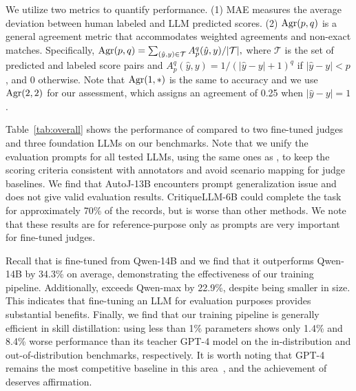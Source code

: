  We utilize two metrics to quantify performance.
(1) MAE measures the average deviation between human labeled and LLM predicted scores.
(2) $\mbox{Agr}(p,q)$ is a general agreement metric that accommodates weighted agreements and non-exact matches. Specifically,
$\mbox{Agr}(p,q)= {\sum_{(\hat{y}, y)\in\mathcal{T}} A^q_p(\hat{y}, y)} / {|\mathcal{T}|},$
where $\mathcal{T}$ is the set of predicted and labeled score pairs  and $A^q_p(\hat{y}, y) = 1 / (|\hat{y} - y| + 1)^q$ if $|\hat{y}-y|< p$, and 0 otherwise. Note that $\mbox{Agr}(1,*)$ is the same to accuracy and we use $\mbox{Agr}(2,2)$ for our assessment, which assigns an agreement of 0.25  when $|\hat{y}-y|=1$.



Table~\ref{tab:overall} shows the performance of \modelname compared to two fine-tuned judges and three foundation LLMs on our benchmarks. Note that we unify the evaluation prompts for all tested LLMs, \ie using the same ones as \modelname, to keep the scoring criteria consistent with annotators and avoid scenario mapping for judge baselines. 
We find that AutoJ-13B encounters prompt generalization issue and does not give valid evaluation results. CritiqueLLM-6B could complete the task for approximately 70\% of the records, but is worse than other methods. We note that these results are for reference-purpose only as prompts are very important for fine-tuned judges. 

Recall that \modelname is fine-tuned from Qwen-14B and we find that it outperforms Qwen-14B by 34.3\% on average, demonstrating the effectiveness of our training pipeline. Additionally, \modelname exceeds Qwen-max by 22.9\%, despite being smaller in size. This indicates that fine-tuning an LLM for evaluation purposes provides substantial benefits.
Finally, we find that our training pipeline is generally efficient in skill distillation: \modelname using less than 1\% parameters shows only 1.4\% and 8.4\% worse performance than its teacher GPT-4 model on the in-distribution \syndata and out-of-distribution \aligndata benchmarks, respectively. It is worth noting that GPT-4 remains the most competitive baseline in this area~\cite{zheng2023judging,vu2024foundationalautoraterstaminglarge}, and the achievement of \modelname deserves affirmation.

